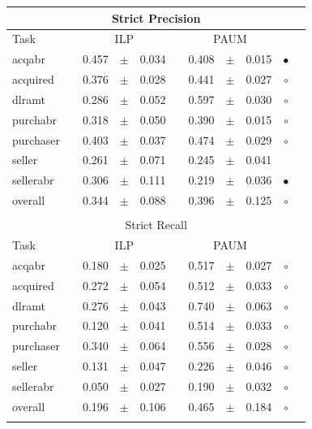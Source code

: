 \begin{table}[th!]
\centering 
\begin{tabular}
{lcrclcrcl@{\hspace{0.1cm}}cc}

\multicolumn{11}{c}{Strict Precision}\\
\hline
Task && \multicolumn{3}{c}{ILP}  && \multicolumn{3}{c}{PAUM} && \\
\hline
            acqabr &&      0.457 &  $\pm$  &       0.034 & &      0.408 &  $\pm$  &       0.015 & $\bullet$ \\
          acquired &&      0.376 &  $\pm$  &       0.028 & &      0.441 &  $\pm$  &       0.027 & $\circ$ \\
            dlramt &&      0.286 &  $\pm$  &       0.052 & &      0.597 &  $\pm$  &       0.030 & $\circ$ \\
          purchabr &&      0.318 &  $\pm$  &       0.050 & &      0.390 &  $\pm$  &       0.015 & $\circ$ \\
         purchaser &&      0.403 &  $\pm$  &       0.037 & &      0.474 &  $\pm$  &       0.029 & $\circ$ \\
            seller &&      0.261 &  $\pm$  &       0.071 & &      0.245 &  $\pm$  &       0.041 &  \\
         sellerabr &&      0.306 &  $\pm$  &       0.111 & &      0.219 &  $\pm$  &       0.036 & $\bullet$ \\
\hline
           overall &&      0.344 &  $\pm$  &       0.088 & &      0.396 &  $\pm$  &       0.125 & $\circ$ \\
\hline
\\

\multicolumn{11}{c}{Strict Recall}\\
\hline
Task && \multicolumn{3}{c}{ILP}  && \multicolumn{3}{c}{PAUM} && \\
\hline
            acqabr &&      0.180 &  $\pm$  &       0.025 & &      0.517 &  $\pm$  &       0.027 & $\circ$ \\
          acquired &&      0.272 &  $\pm$  &       0.054 & &      0.512 &  $\pm$  &       0.033 & $\circ$ \\
            dlramt &&      0.276 &  $\pm$  &       0.043 & &      0.740 &  $\pm$  &       0.063 & $\circ$ \\
          purchabr &&      0.120 &  $\pm$  &       0.041 & &      0.514 &  $\pm$  &       0.033 & $\circ$ \\
         purchaser &&      0.340 &  $\pm$  &       0.064 & &      0.556 &  $\pm$  &       0.028 & $\circ$ \\
            seller &&      0.131 &  $\pm$  &       0.047 & &      0.226 &  $\pm$  &       0.046 & $\circ$ \\
         sellerabr &&      0.050 &  $\pm$  &       0.027 & &      0.190 &  $\pm$  &       0.032 & $\circ$ \\
\hline
           overall &&      0.196 &  $\pm$  &       0.106 & &      0.465 &  $\pm$  &       0.184 & $\circ$ \\
\hline
\\


\end{tabular}
\end{table}
